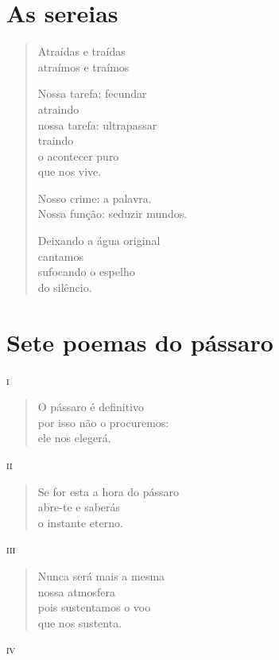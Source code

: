 \chapter{As sereias}

\begin{verse}
Atraídas e traídas\\
atraímos e traímos

Nossa tarefa: fecundar\\
\hfill atraindo\\
nossa tarefa: ultrapassar\\
\hfill traindo\\
o acontecer puro\\
que nos vive.

Nosso crime: a palavra.\\
Nossa função: seduzir mundos.

Deixando a água original\\
cantamos\\
sufocando o espelho\\
do silêncio.
\end{verse}


\chapter{Sete poemas do pássaro}

\forceindent\textsc{i}

\begin{verse}
O pássaro é definitivo\\
por isso não o procuremos:\\
ele nos elegerá.
\end{verse}

\medskip
\textsc{ii}

\begin{verse}
Se for esta a hora do pássaro\\
abre-te e saberás\\
o instante eterno.
\end{verse}

\medskip
\textsc{iii}

\begin{verse}
Nunca será mais a mesma\\
nossa atmosfera\\
pois sustentamos o voo\\
que nos sustenta.
\end{verse}

\medskip
\textsc{iv}

